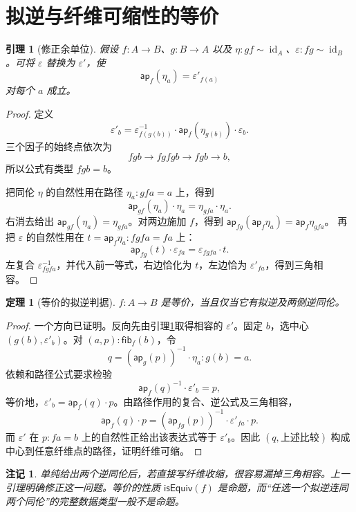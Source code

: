 \documentclass[12pt,oneside,openany,fontset=none]{ctexbook}
\theoremstyle{cn}
\newtheorem{lemma}[definition]{引理}
\newtheorem{theorem}[definition]{定理}
\newtheorem{remark}[definition]{注记}
\numberwithin{equation}{chapter}
\newcommand{\id}{\operatorname{id}}
\newcommand{\ap}{\mathsf{ap}}
\newcommand{\isEquiv}{\mathsf{isEquiv}}
\newcommand{\fib}{\mathsf{fib}}
\begin{document}
\section{拟逆与纤维可缩性的等价}
\begin{lemma}[修正余单位]\label{lem:adjointify}
假设 $f:A\to B$、$g:B\to A$ 以及 $\eta:gf\sim\id_A$、$\varepsilon:fg\sim\id_B$。可将 $\varepsilon$ 替换为 $\varepsilon'$，使
\[
\ap_f(\eta_a)=\varepsilon'_{f(a)}
\]
对每个 $a$ 成立。
\end{lemma}
\begin{proof}
定义
\[
\varepsilon'_b
=\varepsilon_{f(g(b))}^{-1}
\cdot\ap_f(\eta_{g(b)})\cdot\varepsilon_b.
\]
三个因子的始终点依次为
\[
fgb\longrightarrow fgfgb\longrightarrow fgb\longrightarrow b,
\]
所以公式有类型 $fgb=b$。

把同伦 $\eta$ 的自然性用在路径 $\eta_a:gfa=a$ 上，得到
\[
\ap_{gf}(\eta_a)\cdot\eta_a=\eta_{gfa}\cdot\eta_a.
\]
右消去给出 $\ap_{gf}(\eta_a)=\eta_{gfa}$。对两边施加 $f$，得到
$\ap_{fg}(\ap_f\eta_a)=\ap_f\eta_{gfa}$。
再把 $\varepsilon$ 的自然性用在 $t=\ap_f\eta_a:fgfa=fa$ 上：
\[
\ap_{fg}(t)\cdot\varepsilon_{fa}=\varepsilon_{fgfa}\cdot t.
\]
左复合 $\varepsilon_{fgfa}^{-1}$，并代入前一等式，右边恰化为 $t$，左边恰为 $\varepsilon'_{fa}$，得到三角相容。
\end{proof}
\begin{theorem}[等价的拟逆判据]\label{thm:equiv-qinv}
$f:A\to B$ 是等价，当且仅当它有拟逆及两侧逆同伦。
\end{theorem}
\begin{proof}
一个方向已证明。反向先由引理\ref{lem:adjointify}取得相容的 $\varepsilon'$。固定 $b$，选中心 $(g(b),\varepsilon'_b)$。对 $(a,p):\fib_f(b)$，令
\[
q=(\ap_g(p))^{-1}\cdot\eta_a:g(b)=a.
\]
依赖和路径公式要求检验
\[
\ap_f(q)^{-1}\cdot\varepsilon'_b=p,
\]
等价地，$\varepsilon'_b=\ap_f(q)\cdot p$。由路径作用的复合、逆公式及三角相容，
\[
\ap_f(q)\cdot p
=(\ap_{fg}(p))^{-1}\cdot\varepsilon'_{fa}\cdot p.
\]
而 $\varepsilon'$ 在 $p:fa=b$ 上的自然性正给出该表达式等于 $\varepsilon'_b$。因此 $(q,\text{上述比较})$ 构成中心到任意纤维点的路径，证明纤维可缩。
\end{proof}
\begin{remark}
单纯给出两个逆同伦后，若直接写纤维收缩，很容易漏掉三角相容。上一引理明确修正这一问题。等价的性质 $\isEquiv(f)$ 是命题，而“任选一个拟逆连同两个同伦”的完整数据类型一般不是命题。
\end{remark}
\end{document}
